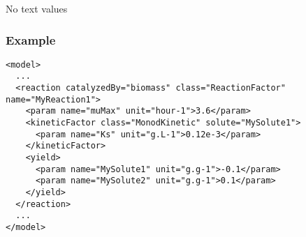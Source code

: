 No text values



\subsubsection{Example}

\begin{verbatim}
<model>
  ...  
  <reaction catalyzedBy="biomass" class="ReactionFactor" name="MyReaction1">
    <param name="muMax" unit="hour-1">3.6</param>
    <kineticFactor class="MonodKinetic" solute="MySolute1">
      <param name="Ks" unit="g.L-1">0.12e-3</param>
    </kineticFactor>
    <yield>
      <param name="MySolute1" unit="g.g-1">-0.1</param>
      <param name="MySolute2" unit="g.g-1">0.1</param>
    </yield>
  </reaction>
  ...  
</model>
\end{verbatim}
